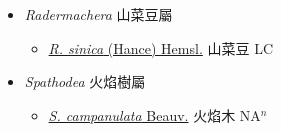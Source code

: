 
  \begin{itemize}
 \item[] \textit{Radermachera} 山菜豆屬
                    
  \begin{itemize}
        \item[] \href{http://www.theplantlist.org/tpl1.1/search?q=Radermachera+sinica}{\textit{R. sinica} (Hance) Hemsl.}   山菜豆 LC
  \end{itemize}
 \item[] \textit{Spathodea} 火焰樹屬
                    
  \begin{itemize}
        \item[] \href{http://www.theplantlist.org/tpl1.1/search?q=Spathodea+campanulata}{\textit{S. campanulata} Beauv.}   火焰木 NA$^n$
  \end{itemize}
  \end{itemize}
